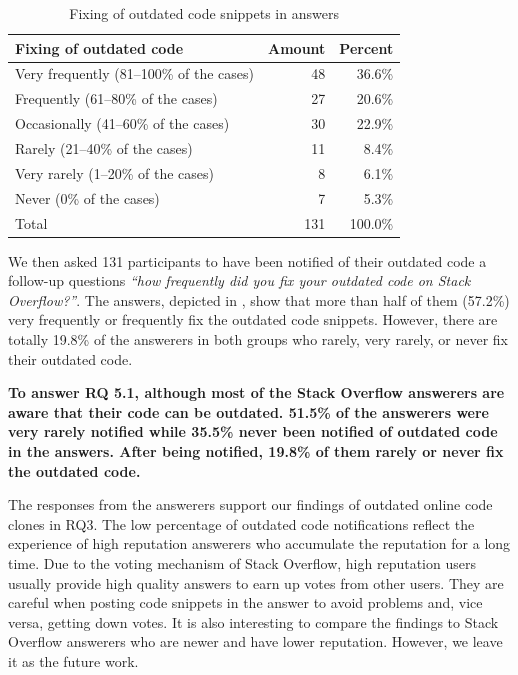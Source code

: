 \documentclass[10pt,journal,compsoc]{IEEEtran}
\begin{document}
\begin{table}
	\centering
	\caption{Fixing of outdated code snippets in answers}
	\label{tab:survey_code_snippet_outdated_fix}
	\begin{tabular}{lrr}
		\toprule
		Fixing of outdated code & Amount & Percent \\
		\midrule
		Very frequently (81--100\% of the cases) & 48 & 36.6\% \\
		Frequently (61--80\% of the cases) & 27 & 20.6\% \\
		Occasionally (41--60\% of the cases) & 30 & 22.9\% \\
		Rarely (21--40\% of the cases) & 11 & 8.4\% \\
		Very rarely (1--20\% of the cases) & 8 & 6.1\% \\
		Never (0\% of the cases) & 7 & 5.3\% \\
		\midrule
		Total & 131 & 100.0\% \\
		\bottomrule
	\end{tabular}
\end{table}

We then asked 131 participants to have been notified of their outdated code a
follow-up questions \textit{``how frequently did you fix your outdated code on Stack
Overflow?''}. The answers, depicted in
, show that more than half of them
(57.2\%) very frequently or frequently fix the outdated code snippets. However,
there are totally 19.8\% of the answerers in both groups who rarely, very rarely, or never fix 
their outdated code.

\textbf{To answer RQ 5.1, although most of the Stack Overflow answerers are aware that their code
can be outdated. 51.5\% of the answerers were very rarely notified while 35.5\% never been notified of
outdated code in the answers. After being notified, 19.8\% of them rarely or never fix the outdated code.}

The responses from the answerers support our findings of outdated online code
clones in RQ3. The low percentage of outdated code notifications
reflect the experience of high reputation answerers who accumulate the reputation for a
long time. Due to the voting mechanism of Stack Overflow, high reputation users
usually provide high quality answers to earn up votes from other users. They are
careful when posting code snippets in the answer to avoid problems and, vice versa, 
getting down votes. It is also interesting to compare the findings to
Stack Overflow answerers who are newer and have lower reputation. However, we
leave it as the future work.
\end{document}
